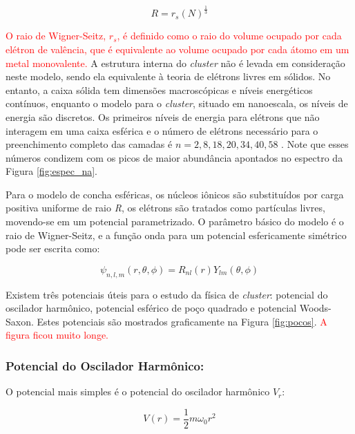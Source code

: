 \begin{equation}
\label{eq:raio_R}
    R = r_{s}(N)^{\frac{1}{3}}
\end{equation}

\textcolor{red}{O raio de Wigner-Seitz, $r_{s}$, é definido como o raio do volume ocupado por cada elétron de valência, que é equivalente ao volume ocupado por cada átomo em um metal monovalente.}
A estrutura interna do \textit{cluster} não é levada em consideração neste modelo, sendo ela equivalente à teoria de elétrons livres em sólidos. No entanto, a caixa sólida tem dimensões macroscópicas e níveis energéticos contínuos, enquanto o modelo para o \textit{cluster}, situado em nanoescala, os níveis de energia são discretos. Os primeiros níveis de energia para elétrons que não interagem em uma caixa esférica e o número de elétrons necessário para o preenchimento completo das camadas é $n= 2,8,18,20,34,40,58$ \cite{livro_cap16_Misra2012527}. Note que esses números condizem com os picos de maior abundância apontados no espectro da Figura \ref{fig:espec_na}.






Para o modelo de concha esféricas, os núcleos iônicos são substituídos por carga positiva uniforme de raio \textit{R}, os elétrons são tratados como partículas livres, movendo-se em um potencial parametrizado. O parâmetro básico do modelo é o raio de Wigner-Seitz, e a função onda para um potencial esfericamente simétrico pode ser escrita como:

\begin{equation}
    \psi_{ n,l,m}(r, \theta, \phi) = R_{nl}(r)Y_{lm}(\theta, \phi)
\end{equation}

Existem três potenciais úteis para o estudo da física de \textit{cluster}: potencial do oscilador harmônico, potencial esférico de poço quadrado e potencial Woods-Saxon. Estes potenciais são mostrados graficamente na Figura \ref{fig:pocos}. \textcolor{red}{A figura ficou muito longe.}

\subsubsection{Potencial do Oscilador Harmônico:}

O potencial mais simples é o potencial do oscilador harmônico $V_{r}$:

\begin{equation}
    V(r)= \frac{1}{2}m\omega_0r^2
\end{equation}


